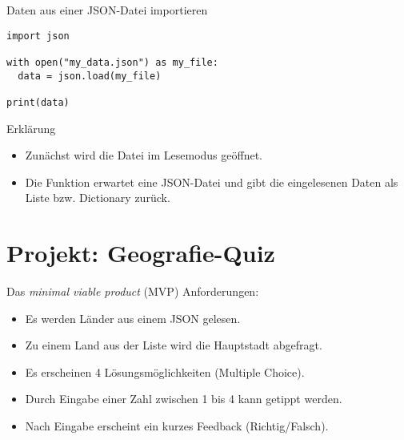 \begin{fragile}
\begin{block}{Daten aus einer JSON-Datei importieren}
\vspace{2pt}

\begin{verbatim}
import json 

with open("my_data.json") as my_file:
  data = json.load(my_file)
  
print(data)
\end{verbatim}

\pause

\vspace{12pt}

\begin{exampleblock}{Erklärung}
\vspace{2pt}
\begin{itemize}[<+->]
\item Zunächst wird die Datei  im Lesemodus geöffnet.  
\item Die Funktion  erwartet eine JSON-Datei und gibt die eingelesenen Daten als Liste bzw. Dictionary zurück.  
\end{itemize}
\end{exampleblock}
\end{block}
\end{fragile}




\section{Projekt: Geografie-Quiz}


\begin{frame}
\begin{block}{Das \emph{minimal viable product} (MVP)}
\vspace{2pt}
Anforderungen: 
\pause 
\begin{itemize}[<+->]
	\item Es werden Länder aus einem JSON gelesen.
	\item Zu einem Land aus der Liste wird die Hauptstadt abgefragt.
	\item Es erscheinen 4 Lösungsmöglichkeiten (Multiple Choice).
	\item Durch Eingabe einer Zahl zwischen 1 bis 4 kann getippt werden. 
	\item Nach Eingabe erscheint ein kurzes Feedback (Richtig/Falsch).  
\end{itemize}
\end{block}
\end{frame}
	
